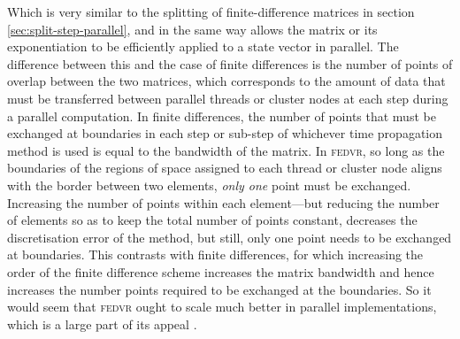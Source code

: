 Which is very similar to the splitting of finite-difference matrices in section \ref{sec:split-step-parallel}, and in the same way allows the matrix or its exponentiation to be efficiently applied to a state vector in parallel. The difference between this and the case of finite differences is the number of points of overlap between the two matrices, which corresponds to the amount of data that must be transferred between parallel threads or cluster nodes at each step during a parallel computation. In finite differences, the number of points that must be exchanged at boundaries in each step or sub-step of whichever time propagation method is used is equal to the bandwidth of the matrix. In \textsc{fedvr}, so long as the boundaries of the regions of space assigned to each thread or cluster node aligns with the border between two elements, \emph{only one} point must be exchanged. Increasing the number of points within each element---but reducing the number of elements so as to keep the total number of points constant, decreases the discretisation error of the method, but still, only one point needs to be exchanged at boundaries. This contrasts with finite differences, for which increasing the order of the finite difference scheme increases the matrix bandwidth and hence increases the number points required to be exchanged at the boundaries. So it would seem that \textsc{fedvr} ought to scale much better in parallel implementations, which is a large part of its appeal \cite{schneider_discrete_2005,schneider_parallel_2006}.

